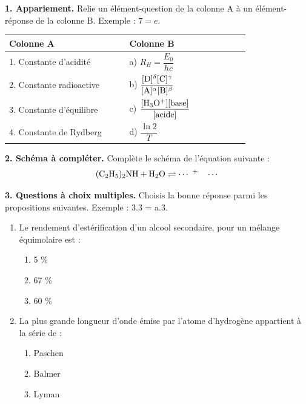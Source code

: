 \documentclass[11pt]{article}
\begin{document}



\noindent\textbf{1. Appariement.} Relie un élément-question de la colonne A à un élément-réponse de la colonne B. Exemple : $7 = e$.

\begin{center}\renewcommand{\arraystretch}{2}
\begin{tabular}{|p{0.42\linewidth}|p{0.42\linewidth}|}
\hline
\textbf{Colonne A} & \textbf{Colonne B} \\
\hline
1. Constante d'acidité & a) $R_H = \dfrac{E_0}{hc}$ \\
\hline
2. Constante radioactive & b) $\dfrac{[\mathrm{D}]^\delta [\mathrm{C}]^\gamma}{[\mathrm{A}]^\alpha [\mathrm{B}]^\beta}$ \\
\hline
3. Constante d'équilibre & c) $\dfrac{[\mathrm{H_3O^+}][\text{base}]}{[\text{acide}]}$ \\
\hline
4. Constante de Rydberg & d) $\dfrac{\ln 2}{T}$ \\
\hline
\end{tabular}
\end{center}

\noindent\textbf{2. Schéma à compléter.} Complète le schéma de l'équation suivante :
\[ \mathrm{(C_2H_5)_2NH + H_2O} \rightleftharpoons \cdots\ ^+ \quad \cdots \]

\medskip
\noindent\textbf{3. Questions à choix multiples.} Choisis la bonne réponse parmi les propositions suivantes. Exemple : 3.3 = a.3.
\begin{enumerate}[label=3.\arabic*)]
  \item Le rendement d'estérification d'un alcool secondaire, pour un mélange équimolaire est :
  \begin{enumerate}[label=a.\arabic*)]
    \item 5 \%
    \item 67 \%
    \item 60 \%
  \end{enumerate}
  \item La plus grande longueur d'onde émise par l'atome d'hydrogène appartient à la série de :
  \begin{enumerate}[label=b.\arabic*)]
    \item Paschen
    \item Balmer
    \item Lyman
  \end{enumerate}
\end{enumerate}
\end{document}
